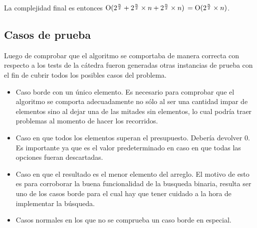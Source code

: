 La complejidad final es entonces
$\operatorname{O}(2^{\frac{n}{2}} + 2^{\frac{n}{2}} \times n + 2^{\frac{n}{2}} \times n)$
$ = \operatorname{O}(2^{\frac{n}{2}} \times n)$.

\subsection{Casos de prueba}

Luego de comprobar que el algoritmo se comportaba de manera correcta con
respecto a los tests de la cátedra fueron generadas otras instancias de prueba
con el fin de cubrir todos los posibles casos del problema.

\begin{itemize}
\item Caso borde con un único elemento. Es necesario para comprobar que el
algoritmo se comporta adecuadamente no sólo al ser una cantidad impar de
elementos sino al dejar una de las mitades sin elementos, lo cual podría traer
problemas al momento de hacer los recorridos.
\item Caso en que todos los elementos superan el presupuesto. Debería devolver
0. Es importante ya que es el valor predeterminado en caso en que todas las
opciones fueran descartadas.
\item Caso en que el resultado es el menor elemento del arreglo. El motivo de
esto es para corroborar la buena funcionalidad de la busqueda binaria, resulta
ser uno de los casos borde para el cual hay que tener cuidado a la hora de
implementar la búsqueda.
\item Casos normales en los que no se comprueba un caso borde en especial.
\end{itemize}